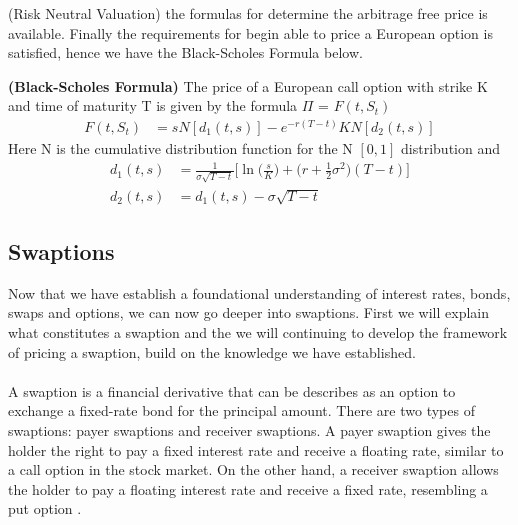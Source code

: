 (Risk Neutral Valuation) the formulas for determine the arbitrage free price is available. Finally the requirements
for begin able to price a European option is satisfied, hence we have the Black-Scholes Formula below.
\begin{proposition}
    \textbf{(Black-Scholes Formula)} The price of a European call option with strike K and time of maturity T 
    is given by the formula $\Pi$ = $F(t,S_t)$
    \begin{align*}
        F(t,S_t) & =s N[d_1(t,s)] -e^{-r(T-t)}KN[d_2(t,s)]  
    \end{align*}
    Here N is the cumulative distribution function for the N $[0,1]$ distribution and 
    \begin{align*}
        d_1(t,s) &= \frac{1}{\sigma \sqrt{T-t}} \Big[ \ln \Big(\frac{s}{K} \Big) +  \Big(r + \frac{1}{2} \sigma^2)(T-t)  \Big] \\
        d_2(t,s) &= d_1(t,s)-\sigma \sqrt{T-t}
    \end{align*}
    \cite{Bjork}
\end{proposition}
\subsection{Swaptions}
Now that we have establish a foundational understanding of interest rates, bonds, swaps and options, we can
now go deeper into swaptions. First we will explain what constitutes a swaption and the we will continuing 
to develop the framework of pricing a swaption, build on the knowledge we have established.  
\\\\
A swaption is a financial derivative that can be describes as an option to exchange a fixed-rate bond for the principal
amount. 
There are two types of swaptions: payer swaptions and receiver swaptions.
A payer swaption gives the holder the right to pay a fixed interest rate and receive a floating rate, 
similar to a call option in the stock market. On the other hand, a receiver swaption allows the holder
to pay a floating interest rate and receive a fixed rate, resembling a put option \cite{Lindstrom} .


